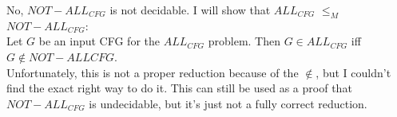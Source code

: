 \documentclass{article}
\begin{document}
No, $NOT-ALL_{CFG}$ is not decidable. I will show that $ALL_{CFG}$ $\leq_M$ $NOT-ALL_{CFG}$:\\
Let $G$ be an input CFG for the $ALL_{CFG}$ problem. Then $G \in ALL_{CFG}$ iff $G \notin NOT-ALL{CFG}$.\\
Unfortunately, this is not a proper reduction because of the $\notin$, but I couldn't find the exact right way to do it.
This can still be used as a proof that $NOT-ALL_{CFG}$ is undecidable, but it's just not a fully correct reduction.
\end{document}
